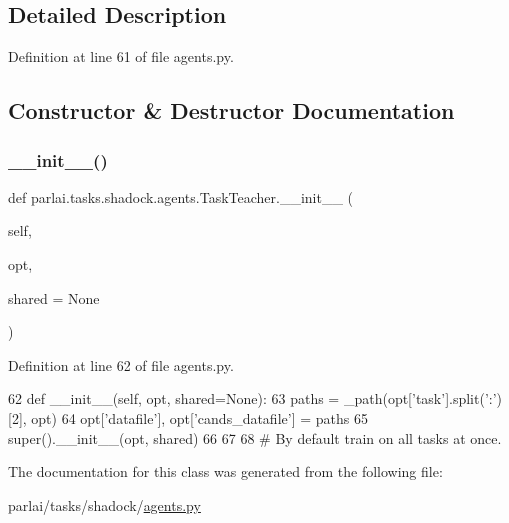 \subsection{Detailed Description}


Definition at line 61 of file agents.\+py.



\subsection{Constructor \& Destructor Documentation}
\mbox{\label{classparlai_1_1tasks_1_1shadock_1_1agents_1_1TaskTeacher_ae092a060ee469d5ffe511ad6bbed2fa9}} 
\subsubsection{\texorpdfstring{\+\_\+\+\_\+init\+\_\+\+\_\+()}{\_\_init\_\_()}}
{\footnotesize\ttfamily def parlai.\+tasks.\+shadock.\+agents.\+Task\+Teacher.\+\_\+\+\_\+init\+\_\+\+\_\+ (\begin{DoxyParamCaption}\item[{}]{self,  }\item[{}]{opt,  }\item[{}]{shared = {\ttfamily None} }\end{DoxyParamCaption})}



Definition at line 62 of file agents.\+py.


\begin{DoxyCode}
62     \textcolor{keyword}{def }\_\_init\_\_(self, opt, shared=None):
63         paths = \_path(opt[\textcolor{stringliteral}{'task'}].split(\textcolor{stringliteral}{':'})[2], opt)
64         opt[\textcolor{stringliteral}{'datafile'}], opt[\textcolor{stringliteral}{'cands\_datafile'}] = paths
65         super().\_\_init\_\_(opt, shared)
66 
67 
68 \textcolor{comment}{# By default train on all tasks at once.}
\end{DoxyCode}


The documentation for this class was generated from the following file\+:\begin{DoxyCompactItemize}
\item 
parlai/tasks/shadock/\hyperlink{parlai_2tasks_2shadock_2agents_8py}{agents.\+py}\end{DoxyCompactItemize}
